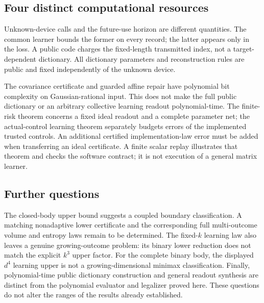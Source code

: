 \subsection{Four distinct computational resources}
Unknown-device calls and the future-use horizon are different
quantities.  The common learner bounds the former on every record;
the latter appears only in the loss.  A public code charges the
fixed-length transmitted index, not a target-dependent dictionary.
All dictionary parameters and reconstruction rules are public and
fixed independently of the unknown device.

The covariance certificate and guarded affine repair have polynomial
bit complexity on Gaussian-rational input.  This does not make the
full public dictionary or an arbitrary collective learning readout
polynomial-time.  The finite-risk theorem concerns a fixed ideal
readout and a complete parameter net; the actual-control learning
theorem separately budgets errors of the implemented trusted controls.
An additional certified implementation-law error must be added when
transferring an ideal certificate.  A finite scalar replay illustrates
that theorem and checks the software contract; it is not execution of
a general matrix learner.

\subsection{Further questions}
The closed-body upper bound suggests a coupled boundary classification.
A matching nonadaptive lower certificate and the corresponding full
multi-outcome volume and entropy laws remain to be determined.  The
fixed-$k$ learning law also leaves a genuine growing-outcome problem:
its binary lower reduction does not match the explicit $k^3$ upper
factor.  For the complete binary body, the displayed $d^4$ learning
upper is not a growing-dimensional minimax classification.  Finally,
polynomial-time public dictionary construction and general readout
synthesis are distinct from the polynomial evaluator and legalizer
proved here.  These questions do not alter the ranges of the results
already established.
